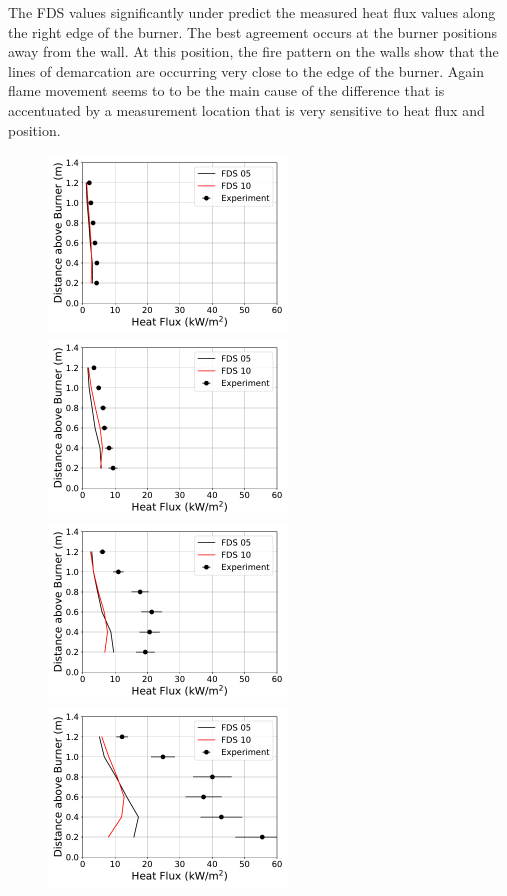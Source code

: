 \documentclass[twoside]{uocthesis}
\begin{document}
{The FDS values significantly under predict the measured heat flux values along the right edge of the burner.  The best agreement occurs at the burner positions away from the wall.  At this position, the fire pattern on the walls show that the lines of demarcation are occurring very close to the edge of the burner.  Again flame movement seems to to be the main cause of the difference that is accentuated by a measurement location that is very sensitive to heat flux and position.           

\begin{figure}[ht!]
  \centering
  \includegraphics[width=2.5in]{../Figures/IWGB_NG_HF_Offset_Avg_2D_RI}
  \includegraphics[width=2.5in]{../Figures/IWGB_NG_HF_Offset_Avg_1D_RI}\\
  \includegraphics[width=2.5in]{../Figures/IWGB_NG_HF_Offset_Avg_0p5D_RI}
  \includegraphics[width=2.5in]{../Figures/IWGB_NG_HF_Offset_Avg_0D_RI}\\

\end{figure}}
\end{document}
